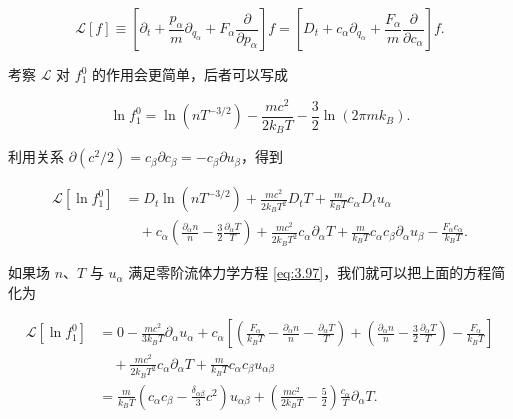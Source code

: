 \begin{equation}\label{eq:3.107}
  \mathscr L[f]\equiv\left[\partial_t+\frac{p_\alpha}{m}\partial_{q_\alpha}+F_\alpha\frac{\partial}{\partial p_\alpha}\right]f=\left[D_t+c_\alpha\partial_{q_\alpha}+\frac{F_\alpha}{m}\frac{\partial}{\partial c_\alpha}\right]f.
\end{equation}

考察 $\mathscr L$ 对 $f_1^0$ 的作用会更简单，后者可以写成

\begin{equation}\label{eq:3.108}
  \ln f_1^0=\ln\left(nT^{-3/2}\right)-\frac{mc^2}{2k_BT}-\frac{3}{2}\ln\left(2\pi mk_B\right).
\end{equation}

利用关系 $\partial(c^2/2)=c_\beta\partial c_\beta=-c_\beta\partial u_\beta$，得到

\begin{equation}\label{eq:3.109}
  \begin{aligned}
    \mathscr L\left[\ln f_1^0\right]&=D_t\ln\left(nT^{-3/2}\right)+\frac{mc^2}{2k_BT^2}D_tT+\frac{m}{k_BT}c_\alpha D_tu_\alpha\\
    &\quad+c_\alpha\left(\frac{\partial_\alpha n}{n}-\frac{3}{2}\frac{\partial_\alpha T}{T}\right)+\frac{mc^2}{2k_BT^2}c_\alpha\partial_\alpha T+\frac{m}{k_BT}c_\alpha c_\beta\partial_\alpha u_\beta-\frac{F_\alpha c_\alpha}{k_BT}.
  \end{aligned}
\end{equation}

如果场 $n$、$T$ 与 $u_\alpha$ 满足零阶流体力学方程 \eqref{eq:3.97}，我们就可以把上面的方程简化为

\begin{equation}\label{eq:3.110}
  \begin{aligned}
    \mathscr L\left[\ln f_1^0\right]&=0-\frac{mc^2}{3k_BT}\partial_\alpha u_\alpha+c_\alpha\left[\left(\frac{F_\alpha}{k_BT}-\frac{\partial_\alpha n}{n}-\frac{\partial_\alpha T}{T}\right)+\left(\frac{\partial_\alpha n}{n}-\frac{3}{2}\frac{\partial_\alpha T}{T}\right)-\frac{F_\alpha}{k_BT}\right]\\
    &\quad+\frac{mc^2}{2k_BT^2}c_\alpha\partial_\alpha T+\frac{m}{k_BT}c_\alpha c_\beta u_{\alpha\beta}\\
    &=\frac{m}{k_BT}\left(c_\alpha c_\beta-\frac{\delta_{\alpha\beta}}{3}c^2\right)u_{\alpha\beta}+\left(\frac{mc^2}{2k_BT}-\frac{5}{2}\right)\frac{c_\alpha}{T}\partial_\alpha T.
  \end{aligned}
\end{equation}

